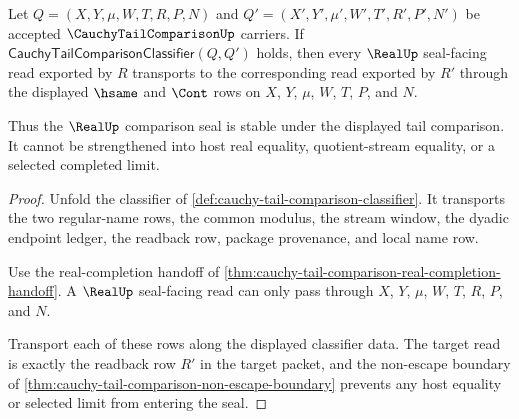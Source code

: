 \begin{theorem}
\label{thm:cauchy-tail-comparison-real-seal-stability}
Let $Q=(X,Y,\mu,W,T,R,P,N)$ and $Q'=(X',Y',\mu',W',T',R',P',N')$ be accepted $\CauchyTailComparisonUp$ carriers. If $\mathsf{CauchyTailComparisonClassifier}(Q,Q')$ holds, then every $\RealUp$ seal-facing read exported by $R$ transports to the corresponding read exported by $R'$ through the displayed $\hsame$ and $\Cont$ rows on $X$, $Y$, $\mu$, $W$, $T$, $P$, and $N$.

Thus the $\RealUp$ comparison seal is stable under the displayed tail comparison. It cannot be strengthened into host real equality, quotient-stream equality, or a selected completed limit.
\end{theorem}
\begin{proof}
Unfold the classifier of \autoref{def:cauchy-tail-comparison-classifier}. It transports the two regular-name rows, the common modulus, the stream window, the dyadic endpoint ledger, the readback row, package provenance, and local name row.

Use the real-completion handoff of \autoref{thm:cauchy-tail-comparison-real-completion-handoff}. A $\RealUp$ seal-facing read can only pass through $X$, $Y$, $\mu$, $W$, $T$, $R$, $P$, and $N$.

Transport each of these rows along the displayed classifier data. The target read is exactly the readback row $R'$ in the target packet, and the non-escape boundary of \autoref{thm:cauchy-tail-comparison-non-escape-boundary} prevents any host equality or selected limit from entering the seal.
\end{proof}

